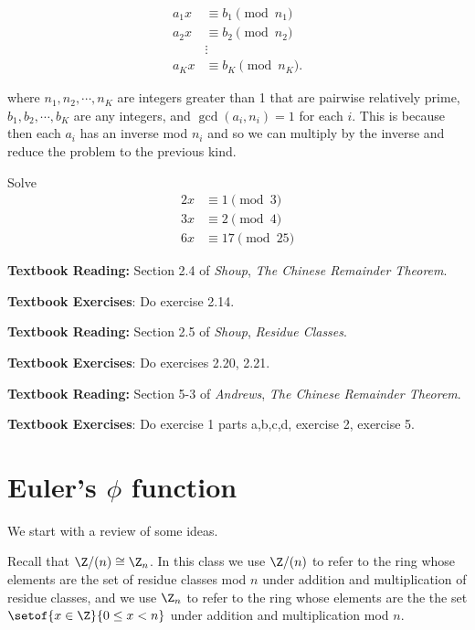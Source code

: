 \documentclass[oneside,12pt]{amsart}
\begin{document}
\begin{align*}
a_1 x &\equiv b_1 \pmod{n_1} \\
a_2 x &\equiv b_2 \pmod{n_2} \\
  &\vdots \\
a_K x &\equiv b_K \pmod{n_K}.
\end{align*}

where $n_1,n_2,\cdots,n_K$ are integers greater than 1 that are pairwise relatively prime, 
$b_1,b_2,\cdots,b_K$ are any integers, and $\gcd(a_i,n_i)=1$ for each $i$. This is because
then each $a_i$ has an inverse mod $n_i$ and so we can multiply by the inverse and
reduce the problem to the previous kind.

\begin{in_class_example}
Solve
\begin{align*}
2x &\equiv 1 \pmod 3 \\
3x &\equiv 2 \pmod 4 \\
6x &\equiv 17 \pmod {25}
\end{align*}
\end{in_class_example}

\textbf{Textbook Reading:} Section 2.4 of \emph{Shoup}, \emph{The Chinese Remainder Theorem}.

\textbf{Textbook Exercises}: Do exercise 2.14.

\bigskip

\textbf{Textbook Reading:} Section 2.5 of \emph{Shoup}, \emph{Residue Classes}.

\textbf{Textbook Exercises}: Do exercises 2.20, 2.21.

\bigskip

\textbf{Textbook Reading:} Section 5-3 of \emph{Andrews}, \emph{The Chinese Remainder Theorem}.

\textbf{Textbook Exercises}: Do exercise 1 parts a,b,c,d, exercise 2, exercise 5.

\newpage

\section{Euler's $\phi$ function}
We start with a review of some ideas.

Recall that $\Z/(n) \cong \Z_n$. In this class we use $\Z/(n)$ to refer to the 
ring whose elements are the set of residue classes mod $n$ under addition and
multiplication of residue classes, and we use $\Z_n$ to refer to the ring whose
elements are the the set $\setof{x\in\Z}{0\leq x < n}$ under addition and multiplication mod $n$.
\end{document}
